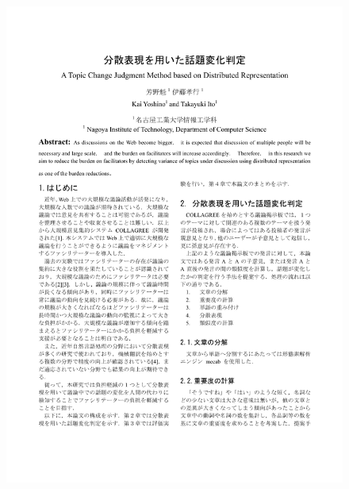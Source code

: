 \begin{figure}
	\centering
	\includegraphics[width=\linewidth,page=3]{../B.SIG-CCI2/yoshino-paper6.pdf}
\end{figure}

